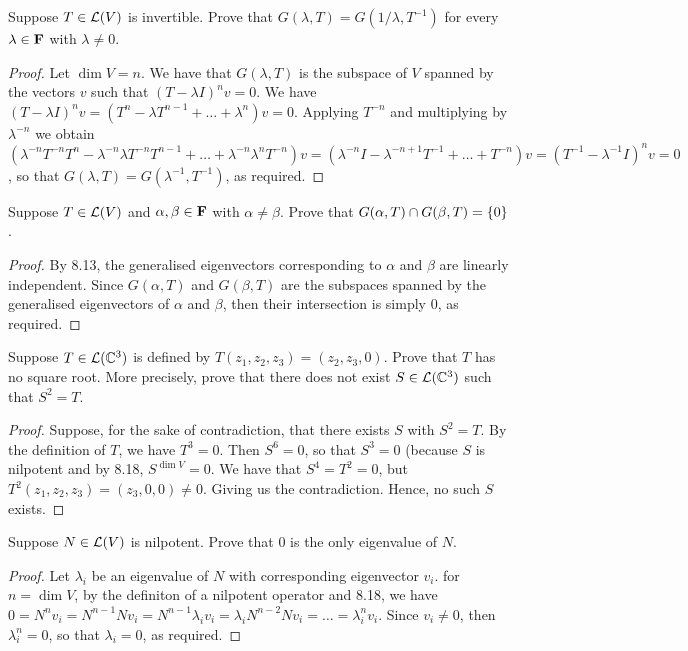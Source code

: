 \begin{exercise}{3}
  Suppose $T\in\mathcal{L}(V)$ is invertible. Prove that $G(\lambda,T)=G(1/\lambda, T^{-1})$ for every $\lambda\in\mathbf{F}$ with $\lambda\neq 0$.
\end{exercise}
\begin{proof}
 Let $\dim V =n$. We have that $G(\lambda, T)$ is the subspace of $V$ spanned by the vectors $v$ such that $(T-\lambda I)^n v =0$. We have $(T-\lambda I)^n v=(T^n -\lambda T^{n-1}+\dots +\lambda^n)v =0$. Applying $T^{-n}$ and multiplying by $\lambda^{-n}$ we obtain $(\lambda^{-n}T^{-n}T^n -\lambda^{-n}\lambda T^{-n}T^{n-1}+\dots +\lambda^{-n}\lambda^nT^{-n})v =(\lambda^{-n}I -\lambda^{-n+1} T^{-1}+\dots + T^{-n})v =(T^{-1}-\lambda^{-1} I)^n v=0$, so that $G(\lambda, T)=G(\lambda^{-1}, T^{-1})$, as required.
\end{proof}

\begin{exercise}{4}
  Suppose $T\in\mathcal{L}(V)$ and $\alpha,\beta\in\mathbf{F}$ with $\alpha\neq\beta$. Prove that $G(\alpha,T)\cap G(\beta,T)=\{0\}$.
\end{exercise}
\begin{proof}
 By 8.13, the generalised eigenvectors corresponding to $\alpha$ and $\beta$ are linearly independent. Since $G(\alpha, T)$ and $G(\beta, T)$ are the subspaces spanned by the generalised eigenvectors of $\alpha$ and $\beta$, then their intersection is simply 0, as required.
\end{proof}

\begin{exercise}{6}
  Suppose $T\in\mathcal{L}(\mathbb{C}^3)$ is defined by $T(z_1,z_2,z_3)=(z_2,z_3,0)$. Prove that $T$ has no square root. More precisely, prove that there does not exist $S\in\mathcal{L}(\mathbb{C}^3)$ such that $S^2=T$.
\end{exercise}
\begin{proof}
 Suppose, for the sake of contradiction, that there exists $S$ with $S^2=T$. By the definition of $T$, we have $T^3=0$. Then $S^6=0$, so that $S^3=0$ (because $S$ is nilpotent and by 8.18, $S^{\dim V}=0$. We have that $S^4 = T^2 =0$, but $T^2(z_1,z_2,z_3) =(z_3,0,0)\neq 0$. Giving us the contradiction. Hence, no such $S$ exists.
\end{proof}

\begin{exercise}{7}
  Suppose $N\in\mathcal{L}(V)$ is nilpotent. Prove that 0 is the only eigenvalue of $N$.
\end{exercise}
\begin{proof}
 Let $\lambda_i$ be an eigenvalue of $N$ with corresponding eigenvector $v_i$. for $n=\dim V$, by the definiton of a nilpotent operator and 8.18, we have $0 =N^nv_i =N^{n-1}Nv_i =N^{n-1}\lambda_i v_i =\lambda_iN^{n-2}Nv_i =\dots =\lambda_i^n v_i$. Since $v_i\neq 0$, then $\lambda_i^n=0$, so that $\lambda_i=0$, as required.
\end{proof}

